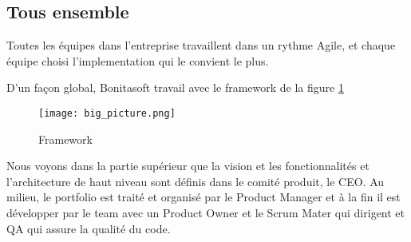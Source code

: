 \subsection{Tous ensemble}

Toutes les équipes dans l'entreprise travaillent dans un rythme Agile, et chaque équipe choisi l'implementation qui le convient le plus.

D'un façon global, Bonitasoft travail avec le framework de la figure \ref{frame_safe}

\begin{figure}[!ht]
\centering
\texttt{[image: big\_picture.png]}
\caption{Framework \cite{safe}}
\label{frame_safe}
\end{figure}

Nous voyons dans la partie supérieur que la vision et les fonctionnalités et l'architecture de haut niveau sont définis dans le comité produit, le CEO.
Au milieu, le portfolio est traité et organisé par le Product Manager et à la fin il est développer par le team avec un Product Owner et le Scrum Mater qui dirigent et QA qui assure la qualité du code.
